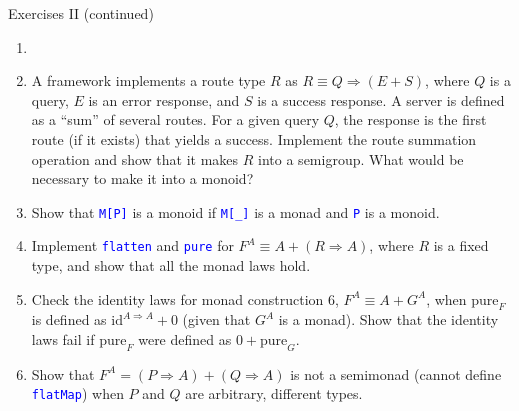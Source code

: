 \documentclass[english]{beamer}
\begin{document}
\begin{frame}{Exercises II (continued)}
\begin{enumerate}
\item []\addtocounter{enumi}{6}\vspace*{-1.5cm}
\item A framework implements a route type $R$ as $R\equiv Q\Rightarrow\left(E+S\right)$,
where $Q$ is a query, $E$ is an error response, and $S$ is a success
response. A server is defined as a ``sum'' of several routes. For
a given query $Q$, the response is the first route (if it exists)
that yields a success. Implement the route summation operation and
show that it makes $R$ into a semigroup. What would be necessary
to make it into a monoid?
\item Show that \texttt{\textcolor{blue}{\footnotesize{}M{[}P{]}}} is a
monoid if \texttt{\textcolor{blue}{\footnotesize{}M{[}\_{]}}} is a
monad and \texttt{\textcolor{blue}{\footnotesize{}P}} is a monoid.
\item Implement \texttt{\textcolor{blue}{\footnotesize{}flatten}} and \texttt{\textcolor{blue}{\footnotesize{}pure}}
for $F^{A}\equiv A+\left(R\Rightarrow A\right)$, where $R$ is a
fixed type, and show that all the monad laws hold.
\item Check the identity laws for monad construction 6, $F^{A}\equiv A+G^{A}$,
when $\text{pure}_{F}$ is defined as $\text{id}^{A\Rightarrow A}+0$
(given that $G^{A}$ is a monad). Show that the identity laws fail
if $\text{pure}_{F}$ were defined as $0+\text{pure}_{G}$.
\item Show that $F^{A}=\left(P\Rightarrow A\right)+\left(Q\Rightarrow A\right)$
is not a semimonad (cannot define \texttt{\textcolor{blue}{\footnotesize{}flatMap}})
when $P$ and $Q$ are arbitrary, different types.
\end{enumerate}
\end{frame}
\end{document}
